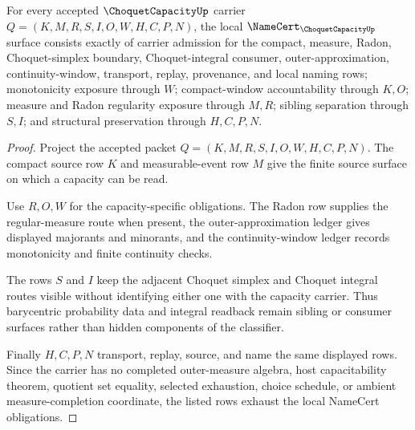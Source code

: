 \begin{theorem}
\label{thm:choquet-capacity-obligation-surface}
For every accepted $\ChoquetCapacityUp$ carrier $Q=(K,M,R,S,I,O,W,H,C,P,N)$, the local $\NameCert_{\ChoquetCapacityUp}$ surface consists exactly of carrier admission for the compact, measure, Radon, Choquet-simplex boundary, Choquet-integral consumer, outer-approximation, continuity-window, transport, replay, provenance, and local naming rows; monotonicity exposure through $W$; compact-window accountability through $K,O$; measure and Radon regularity exposure through $M,R$; sibling separation through $S,I$; and structural preservation through $H,C,P,N$.
\end{theorem}
\begin{proof}
Project the accepted packet $Q=(K,M,R,S,I,O,W,H,C,P,N)$. The compact source row $K$ and measurable-event row $M$ give the finite source surface on which a capacity can be read.

Use $R,O,W$ for the capacity-specific obligations. The Radon row supplies the regular-measure route when present, the outer-approximation ledger gives displayed majorants and minorants, and the continuity-window ledger records monotonicity and finite continuity checks.

The rows $S$ and $I$ keep the adjacent Choquet simplex and Choquet integral routes visible without identifying either one with the capacity carrier. Thus barycentric probability data and integral readback remain sibling or consumer surfaces rather than hidden components of the classifier.

Finally $H,C,P,N$ transport, replay, source, and name the same displayed rows. Since the carrier has no completed outer-measure algebra, host capacitability theorem, quotient set equality, selected exhaustion, choice schedule, or ambient measure-completion coordinate, the listed rows exhaust the local NameCert obligations.
\end{proof}

